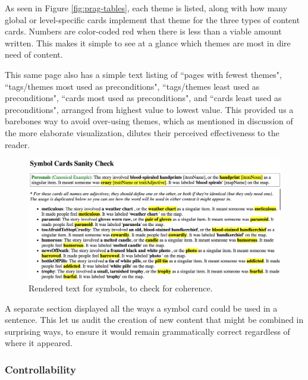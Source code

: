 

As seen in Figure \ref{fig:prag-tables}, each theme is listed, along with how many global or level-specific cards implement that theme for the three types of content cards. Numbers are color-coded red when there is less than a viable amount written. This makes it simple to see at a glance which themes are most in dire need of content.

This same page also has a simple text listing of ``pages with fewest themes", ``tags/themes most used as preconditions", ``tags/themes least used as preconditions", ``cards most used as preconditions", and ``cards least used as preconditions", arranged from highest value to lowest value. This provided us a barebones way to avoid over-using themes, which as mentioned in discussion of the more elaborate visualization, dilutes their perceived effectiveness to the reader.


\begin{figure}
    \centering
    \includegraphics[width=\textwidth]{figures/2-Ice-Bound/symbol-checker.png}
    \caption{Rendered text for symbols, to check for coherence.}
    \label{fig:symbol-checker}
\end{figure}


A separate section displayed all the ways a symbol card could be used in a sentence. This let us audit the creation of new content that might be combined in surprising ways, to ensure it would remain grammatically correct regardless of where it appeared.

\subsubsection{Controllability}\label{subsubsec:icebound-controllability}

